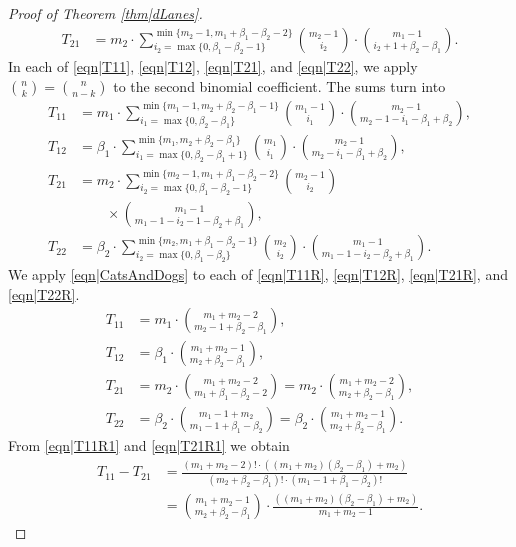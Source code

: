 \documentclass[reqno]{amsart}
\begin{document}
\begin{appendix}
\begin{proof}[Proof of Theorem \ref{thm|dLanes}]
\begin{align}
T_{21}&=m_2\cdot\sum_{i_2=\max\{0,\beta_1-\beta_2-1\}}^{\min\{m_2-1,m_1+\beta_1-\beta_2-2\}}  
\binom{m_2-1}{i_2}\cdot
 \binom{m_1-1}{i_2+1+\beta_2-\beta_1}. \label{eqn|T21}
\end{align}
In each of \eqref{eqn|T11}, \eqref{eqn|T12}, \eqref{eqn|T21}, and \eqref{eqn|T22}, we apply $\binom{n}{k}=\binom{n}{n-k}$ to the second binomial coefficient. The sums turn into 
\begin{align}
T_{11}&= m_1\cdot\sum_{i_1=\max\{0,\beta_2-\beta_1\}}^{\min\{m_1-1,m_2+\beta_2-\beta_1-1\}}  \binom{m_1-1}{i_1}\cdot  \binom{m_2-1}{
m_2-1-
i_1-\beta_1+\beta_2},\label{eqn|T11R}\\
T_{12}&=\beta_1\cdot\sum_{i_1=\max\{0,\beta_2-\beta_1+1\}}^{\min\{m_1,m_2+\beta_2-\beta_1\}}   \binom{m_1}{i_1}\cdot  \binom{m_2-1}{m_2-i_1-\beta_1+\beta_2},\label{eqn|T12R}\\
T_{21}&=m_2\cdot\sum_{i_2=\max\{0,\beta_1-\beta_2-1\}}^{\min\{m_2-1,m_1+\beta_1-\beta_2-2\}}  
\binom{m_2-1}{i_2} \nonumber\\
&\quad\quad\times 
 \binom{m_1-1}{m_1-1-i_2-1-\beta_2+\beta_1}, \label{eqn|T21R}\\
  T_{22}&=\beta_2\cdot\sum_{i_2=\max\{0,\beta_1-\beta_2\}}^{\min\{m_2,m_1+\beta_1-\beta_2-1\}}  
\binom{m_2}{i_2}\cdot
 \binom{m_1-1}{m_1-1-i_2-\beta_2+\beta_1}.\label{eqn|T22R}
\end{align}
We apply \eqref{eqn|CatsAndDogs} to each of \eqref{eqn|T11R}, \eqref{eqn|T12R}, \eqref{eqn|T21R}, and \eqref{eqn|T22R}.
\begin{align}
T_{11}&= m_1\cdot \binom{m_1+m_2-2}{m_2-1+\beta_2-\beta_1},\label{eqn|T11R1}\\
T_{12}&=\beta_1\cdot \binom{m_1+m_2-1}{m_2+\beta_2-\beta_1},\label{eqn|T12R1}  \\
T_{21}&=m_2\cdot \binom{m_1+m_2-2}{m_1+\beta_1-\beta_2-2}=m_2\cdot \binom{m_1+m_2-2}{m_2+\beta_2-\beta_1}, \label{eqn|T21R1}\\
T_{22}&=\beta_2\cdot \binom{m_1-1+m_2}{m_1-1+\beta_1-\beta_2}=\beta_2\cdot \binom{m_1+m_2-1}{m_2+\beta_2-\beta_1}.\label{eqn|T22R1}
\end{align}
From \eqref{eqn|T11R1} and  \eqref{eqn|T21R1} we obtain 
\begin{align}
T_{11}-T_{21}&=
\frac{(m_1+m_2-2)!\cdot \left((m_1+m_2)(\beta_2-\beta_1)+m_2\right)}{(m_2+\beta_2-\beta_1)!\cdot(m_1-1+\beta_1-\beta_2)!}\nonumber\\
&=\binom{m_1+m_2-1}{m_2+\beta_2-\beta_1}\cdot \frac{ \left((m_1+m_2)(\beta_2-\beta_1)+m_2\right)}{m_1+m_2-1}.
\label{eqn|T11mT21}

\end{align}
\end{proof}
\end{appendix}
\end{document}
